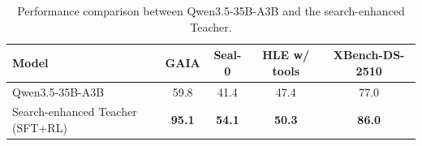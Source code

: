 \begin{table}[]
    \centering
    \footnotesize
    \setlength{\tabcolsep}{8pt}
    \renewcommand{\arraystretch}{1.4}
    \caption{Performance comparison between Qwen3.5-35B-A3B and the search-enhanced Teacher.}
    \label{tab:search_rl_results}

    \begin{tabular}{@{}lcccc@{}}
    \toprule
    \textbf{Model} & \textbf{GAIA} & \textbf{Seal-0} & \textbf{HLE w/ tools} & \textbf{XBench-DS-2510} \\
    \midrule
    Qwen3.5-35B-A3B & 59.8 & 41.4 & 47.4 & 77.0 \\
    Search-enhanced Teacher (SFT+RL) & \textbf{95.1} & \textbf{54.1} & \textbf{50.3} & \textbf{86.0} \\
    \bottomrule
    \end{tabular}
\end{table}
